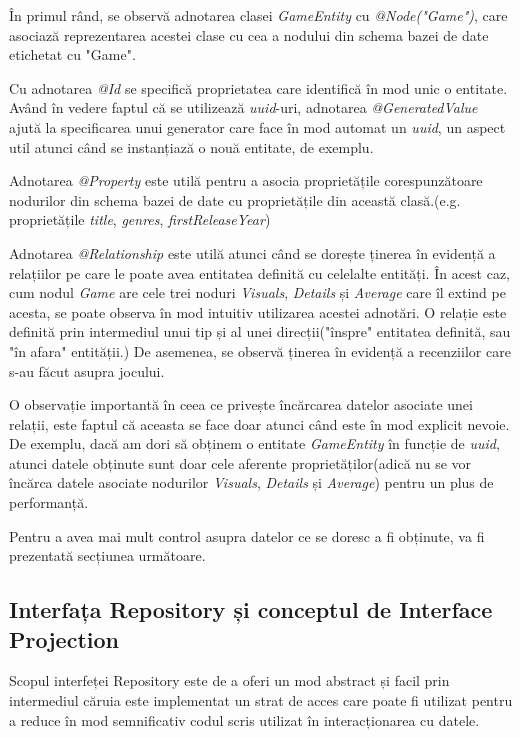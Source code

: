 \documentclass[12pt,a4paper]{report}
\begin{document}
În primul rând, se observă adnotarea clasei \emph{GameEntity} cu \emph{@Node("Game")}, care asociază reprezentarea acestei clase cu cea a nodului din schema bazei de date etichetat cu "Game".

Cu adnotarea \emph{@Id} se specifică proprietatea care identifică în mod unic o entitate. Având în vedere faptul că se utilizează \emph{uuid}-uri, adnotarea \emph{@GeneratedValue} ajută la specificarea unui generator care face în mod automat un \emph{uuid}, un aspect util atunci când se instanțiază o nouă entitate, de exemplu.

Adnotarea \emph{@Property} este utilă pentru a asocia proprietățile corespunzătoare nodurilor din schema bazei de date cu proprietățile din această clasă.(e.g. proprietățile \emph{title}, \emph{genres}, \emph{firstReleaseYear})

Adnotarea \emph{@Relationship} este utilă atunci când se dorește ținerea în evidență a relațiilor pe care le poate avea entitatea definită cu celelalte entități. În acest caz, cum nodul \emph{Game} are cele trei noduri \emph{Visuals}, \emph{Details} și \emph{Average} care îl extind pe acesta, se poate observa în mod intuitiv utilizarea acestei adnotări. O relație este definită prin intermediul unui tip și al unei direcții("înspre" entitatea definită, sau "în afara" entității.) De asemenea, se observă ținerea în evidență a recenziilor care s-au făcut asupra jocului.

O observație importantă în ceea ce privește încărcarea datelor asociate unei relații, este faptul că aceasta se face doar atunci când este în mod explicit nevoie. De exemplu, dacă am dori să obținem o entitate \emph{GameEntity} în funcție de \emph{uuid}, atunci datele obținute sunt doar cele aferente proprietăților(adică nu se vor încărca datele asociate nodurilor \emph{Visuals}, \emph{Details} și \emph{Average}) pentru un plus de performanță.

Pentru a avea mai mult control asupra datelor ce se doresc a fi obținute, va fi prezentată secțiunea următoare.

\subsection{Interfața Repository și conceptul de Interface Projection}

Scopul interfeței Repository este de a oferi un mod abstract și facil prin intermediul căruia este implementat un strat de acces care poate fi utilizat pentru a reduce în mod semnificativ codul scris utilizat în interacționarea cu datele. \cite{22}
\end{document}
